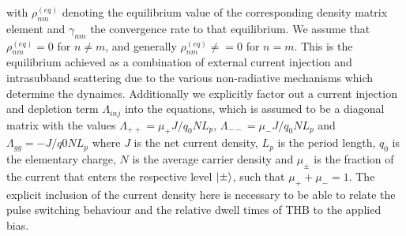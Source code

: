 \documentclass[preprint,secnumarabic,amssymb, nobibnotes, aip, prd]{revtex4-1}
\begin{document}
	with $\rho_{nm}^{(eq)}$ denoting the equilibrium value of the corresponding density matrix element and $\gamma_{nm}$ the convergence rate to that equilibrium. We assume that $\rho_{nm}^{(eq)}=0$ for $n\neq m$, and generally $\rho_{nm}^{(eq)}\neq=0$ for $n = m$. This is the equilibrium achieved as a combination of external current injection and intrasubband scattering due to the various non-radiative mechanisms which determine the dynaimcs. Additionally we explicitly factor out a current injection and depletion term $\Lambda_{inj}$ into the equations, which is assumed to be a diagonal matrix with the values $\Lambda_{++} = \mu_+J/q_0NL_p$, $\Lambda_{--} = \mu_-J/q_0NL_p$  and $\Lambda_{gg} = -J/q0NL_p$ where $J$ is the net current density, $L_p$ is the period length, $q_0$ is the elementary charge, $N$ is the average carrier density and $\mu_{\pm}$ is the fraction of the current that enters the respective level $\ket{\pm}$, such that $\mu_++\mu_-=1$. The explicit inclusion of the current density here is necessary to be able to relate the pulse switching behaviour and the relative dwell times of THB to the applied bias. 
	
\end{document}
